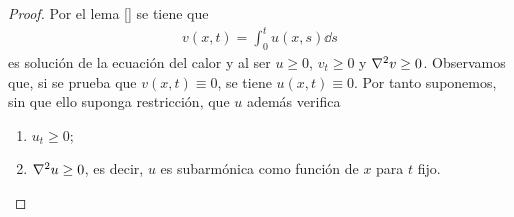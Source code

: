 \documentclass{article}
\theoremstyle{definition}
\theoremstyle{remark}
\begin{document}
  \begin{proof}
    Por el lema \ref{}  %
    se tiene que
    \begin{align}
      v(x, t)
      =
      \int_0^t u(x, s) \dd s
    \end{align}
    es solución de la ecuación del calor y al ser \(u \geq 0\), \(v_t \geq 0\) y \(\laplacian v \geq 0\).
    Observamos que, si se prueba que \(v(x, t) \equiv 0\), se tiene \(u(x, t) \equiv 0\).
    Por tanto suponemos, sin que ello suponga restricción, que \(u\) además verifica
    \begin{enumerate}
      \item \(u_t \geq 0\);
      \item \(\laplacian u \geq 0\), es decir, \(u\) es subarmónica como función de \(x\) para \(t\) fijo.
    \end{enumerate}
    

\end{proof}
\end{document}
